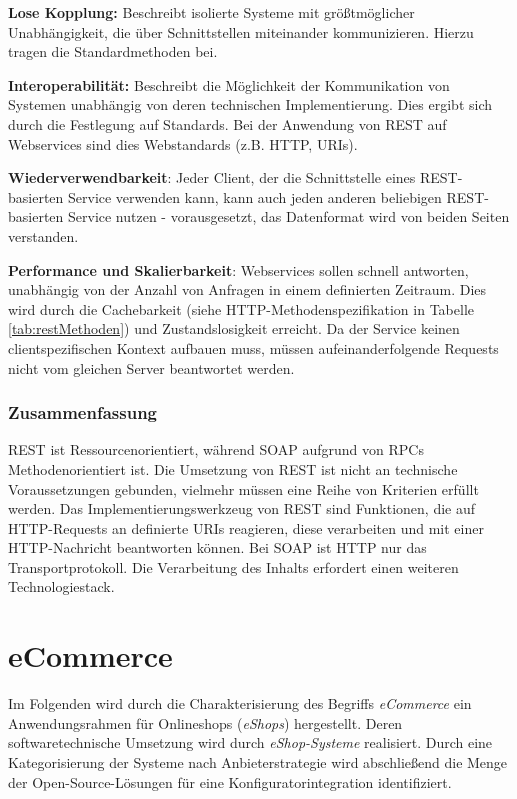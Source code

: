 \documentclass[11pt, a4paper, titlepage, listof=totoc, bibliography=totoc, index=totoc, twoside, openright, headings=normal]{scrreprt}
\begin{document}
\begin{compactitem}
\item [\textbf{Lose Kopplung:}] Beschreibt isolierte Systeme mit größtmöglicher Unabhängigkeit, die über Schnittstellen miteinander kommunizieren. Hierzu tragen die Standardmethoden bei.
\item [\textbf{Interoperabilität:}] Beschreibt die Möglichkeit der Kommunikation von Systemen unabhängig von deren technischen Implementierung. Dies ergibt sich durch die Festlegung auf Standards. Bei der Anwendung von REST auf Webservices sind dies Webstandards (z.B. HTTP, URIs).
\item [\textbf{Wiederverwendbarkeit}:] Jeder Client, der die Schnittstelle eines REST-basierten Service verwenden kann, kann auch jeden anderen beliebigen REST-basierten Service nutzen - vorausgesetzt, das Datenformat wird von beiden Seiten verstanden.
\item [\textbf{Performance und Skalierbarkeit}:] Webservices sollen schnell antworten, unabhängig von der Anzahl von Anfragen in einem definierten Zeitraum. Dies wird durch die Cachebarkeit (siehe HTTP-Methodenspezifikation in Tabelle \ref{tab:restMethoden}) und Zustandslosigkeit erreicht. Da der Service keinen clientspezifischen Kontext aufbauen muss, müssen aufeinanderfolgende Requests nicht vom gleichen Server beantwortet werden.
\end{compactitem}

\subsubsection*{Zusammenfassung}
REST ist Ressourcenorientiert, während SOAP aufgrund von \ac{RPC}s Methodenorientiert ist. Die Umsetzung von REST ist nicht an technische Voraussetzungen gebunden, vielmehr müssen eine Reihe von Kriterien erfüllt werden. Das Implementierungswerkzeug von REST sind Funktionen, die auf HTTP-Requests an definierte URIs reagieren, diese verarbeiten und mit einer HTTP-Nachricht beantworten können. Bei SOAP ist HTTP nur das Transportprotokoll. Die Verarbeitung des Inhalts erfordert einen weiteren Technologiestack.

\section{eCommerce}
\label{eCommerce}

Im Folgenden wird durch die Charakterisierung des Begriffs \emph{eCommerce} ein Anwendungsrahmen für Onlineshops (\emph{eShops}) hergestellt. Deren softwaretechnische Umsetzung wird durch \emph{eShop-Systeme} realisiert. Durch eine Kategorisierung der Systeme nach Anbieterstrategie wird abschließend die Menge der Open-Source-Lösungen für eine Konfiguratorintegration identifiziert.
\end{document}
